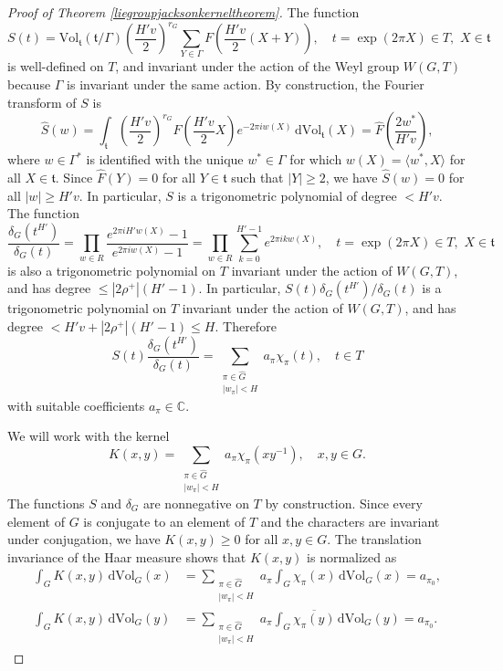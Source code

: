 \documentclass[11pt,a4paper]{article}
\theoremstyle{definition}
\begin{document}
\begin{proof}[Proof of Theorem \ref{liegroupjacksonkerneltheorem}]
The function
\[ S(t) = \mathrm{Vol}_{\mathfrak{t}}(\mathfrak{t}/\Gamma) \left( \frac{H'v}{2} \right)^{r_G} \sum_{Y \in \Gamma} F \left( \frac{H'v}{2} (X+Y) \right), \quad t=\exp (2 \pi X) \in T, \,\, X \in \mathfrak{t} \]
is well-defined on $T$, and invariant under the action of the Weyl group $W(G,T)$ because $\Gamma$ is invariant under the same action. By construction, the Fourier transform of $S$ is
\[ \widehat{S}(w) = \int_{\mathfrak{t}} \left( \frac{H'v}{2} \right)^{r_G} F \left( \frac{H'v}{2} X \right) e^{-2 \pi i w(X)} \, \mathrm{d}\mathrm{Vol}_{\mathfrak{t}}(X) = \widehat{F} \left( \frac{2 w^*}{H'v} \right) , \]
where $w \in \Gamma^*$ is identified with the unique $w^* \in \Gamma$ for which $w(X)=\langle w^* , X \rangle$ for all $X \in \mathfrak{t}$. Since $\widehat{F}(Y)=0$ for all $Y \in \mathfrak{t}$ such that $|Y| \ge 2$, we have $\widehat{S}(w)=0$ for all $|w| \ge H'v$. In particular, $S$ is a trigonometric polynomial of degree $< H'v$. The function
\[ \frac{\delta_G (t^{H'})}{\delta_G (t)} = \prod_{w \in R} \frac{e^{2 \pi i H' w(X)}-1}{e^{2 \pi i w(X)}-1} = \prod_{w \in R} \sum_{k=0}^{H'-1} e^{2 \pi i k w(X)} , \quad t=\exp (2 \pi X) \in T, \,\,  X \in \mathfrak{t} \]
is also a trigonometric polynomial on $T$ invariant under the action of $W(G,T)$, and has degree $\le |2\rho^+| (H'-1)$. In particular, $S(t) \delta_G (t^{H'}) / \delta_G (t)$ is a trigonometric polynomial on $T$ invariant under the action of $W(G,T)$, and has degree $<H'v+|2\rho^+| (H'-1) \le H$. Therefore \cite[Lemma 1]{CK}
\[ S(t) \frac{\delta_G (t^{H'})}{\delta_G (t)} = \sum_{\substack{\pi \in \widehat{G} \\ |w_{\pi}| < H}} a_{\pi} \chi_{\pi} (t), \quad t \in T \]
with suitable coefficients $a_{\pi} \in \mathbb{C}$.

We will work with the kernel
\[ K(x,y) = \sum_{\substack{\pi \in \widehat{G} \\ |w_{\pi}| < H}} a_{\pi} \chi_{\pi} (xy^{-1}), \quad x,y \in G . \]
The functions $S$ and $\delta_G$ are nonnegative on $T$ by construction. Since every element of $G$ is conjugate to an element of $T$ and the characters are invariant under conjugation, we have $K(x,y) \ge 0$ for all $x, y \in G$. The translation invariance of the Haar measure shows that $K(x,y)$ is normalized as
\[ \begin{split} \int_G K(x,y) \, \mathrm{d}\mathrm{Vol}_G (x) &= \sum_{\substack{\pi \in \widehat{G} \\ |w_{\pi}|<H}} a_{\pi} \int_{G} \chi_{\pi} (x) \, \mathrm{d}\mathrm{Vol}_G (x) = a_{\pi_0}, \\ \int_G K(x,y) \, \mathrm{d}\mathrm{Vol}_G (y) &= \sum_{\substack{\pi \in \widehat{G} \\ |w_{\pi}|<H}} a_{\pi} \int_{G} \overline{\chi_{\pi} (y)} \, \mathrm{d}\mathrm{Vol}_G (y) = a_{\pi_0}. \end{split} \]


\end{proof}
\end{document}
